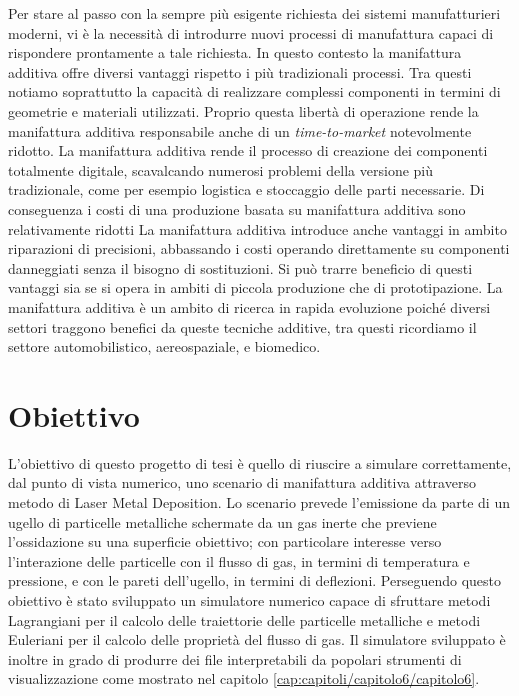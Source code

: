 Per stare al passo con la sempre più esigente richiesta dei sistemi manufatturieri moderni, vi è la necessità di introdurre nuovi processi di
manufattura capaci di rispondere prontamente a tale richiesta. In questo contesto la manifattura additiva offre diversi vantaggi rispetto i più tradizionali
processi. Tra questi notiamo soprattutto la capacità di realizzare complessi componenti in termini di geometrie e materiali utilizzati. Proprio questa
libertà di operazione rende la manifattura additiva responsabile anche di un \textit{time-to-market} notevolmente ridotto. La manifattura additiva rende
il processo di creazione dei componenti totalmente digitale, scavalcando numerosi problemi della versione più tradizionale, come per esempio
logistica e stoccaggio delle parti necessarie. Di conseguenza i costi di una produzione basata su manifattura additiva sono relativamente ridotti
La manifattura additiva introduce anche vantaggi in ambito riparazioni di precisioni, abbassando i costi operando direttamente su componenti danneggiati 
senza il bisogno di sostituzioni. Si può trarre beneficio di questi vantaggi sia se si opera in ambiti di piccola produzione che di prototipazione.
La manifattura additiva è un ambito di ricerca in rapida evoluzione poiché diversi settori traggono benefici da queste tecniche additive, tra questi ricordiamo
il settore automobilistico, aereospaziale, e biomedico. 
\section{Obiettivo}\label{obiettivo}
L'obiettivo di questo progetto di tesi è quello di riuscire a simulare correttamente, dal punto di vista numerico, uno scenario di manifattura additiva
attraverso metodo di Laser Metal Deposition. Lo scenario prevede l'emissione da parte di un ugello di particelle metalliche schermate da un gas inerte
che previene l'ossidazione su una superficie obiettivo; con particolare interesse verso l'interazione delle particelle con il flusso di gas, in termini di temperatura e pressione, e con le pareti
dell'ugello, in termini di deflezioni. Perseguendo questo obiettivo è stato sviluppato un simulatore numerico capace di sfruttare metodi Lagrangiani per il calcolo delle traiettorie delle particelle metalliche
e metodi Euleriani per il calcolo delle proprietà del flusso di gas. Il simulatore sviluppato è inoltre in grado di produrre dei file interpretabili da popolari strumenti di visualizzazione
come mostrato nel capitolo \ref*{cap:capitoli/capitolo6/capitolo6}.

